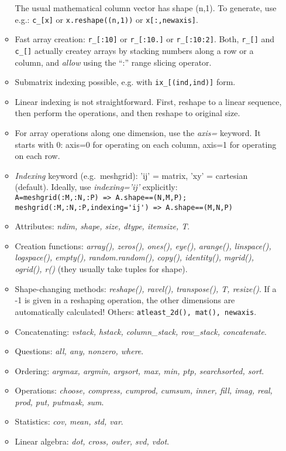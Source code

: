 \documentclass[10pt]{article}
\begin{document}
\begin{enumerate}
\begin{itemize}
    The usual mathematical column vector has shape (n,1). To generate,
    use e.g.: \verb|c_[x]| or \verb|x.reshape((n,1))| or \verb|x[:,newaxis]|.
  \item Fast array creation: \verb|r_[:10]| or \verb|r_[:10.]| or
    \verb|r_[:10:2]|. Both, \verb|r_[]| and \verb|c_[]| actually
    createy arrays by stacking numbers along a row or a column, and
    \emph{allow} using the ``:'' range slicing operator.
  \item Submatrix indexing possible, e.g. with \verb|ix_[(ind,ind)]| form.
  \item Linear indexing is not straightforward. First, reshape to a
    linear sequence, then perform the operations, and then reshape to
    original size.
  \item For array operations along one dimension, use the \emph{axis=}
    keyword. It starts with 0: axis=0 for operating on each column,
    axis=1 for operating on each row.
  \item \emph{Indexing} keyword (e.g.\ meshgrid): 'ij' = matrix, 'xy'
    = cartesian (default). Ideally, use \emph{indexing='ij'}
    explicitly:\\
    \verb|A=meshgrid(:M,:N,:P) => A.shape==(N,M,P); meshgrid(:M,:N,:P,indexing='ij') => A.shape==(M,N,P)|
  \item Attributes: \emph{ndim, shape, size, dtype,
      itemsize, T}.
  \item Creation functions: \emph{array(), zeros(), ones(),
      eye(), arange(), linspace(), logspace(), empty(),
      random.random(), copy(), identity(), mgrid(), ogrid(), r()}
    (they usually take tuples for shape).
  \item Shape-changing methods: \emph{reshape(), ravel(), transpose(),
      T, resize()}. If a -1 is given in a reshaping operation, the
    other dimensions are automatically calculated! Others:
    \verb|atleast_2d(), mat(), newaxis|.
  \item Concatenating: \emph{vstack, hstack, column\_stack, row\_stack,
      concatenate}.
  \item Questions: \emph{all, any, nonzero, where}.
  \item Ordering: \emph{argmax, argmin, argsort, max, min, ptp,
      searchsorted, sort}.
  \item Operations: \emph{choose, compress, cumprod, cumsum, inner,
      fill, imag, real, prod, put, putmask, sum}.
  \item Statistics: \emph{cov, mean, std, var}.
  \item Linear algebra: \emph{dot, cross, outer, svd, vdot}.

\end{itemize}
\end{enumerate}
\end{document}
